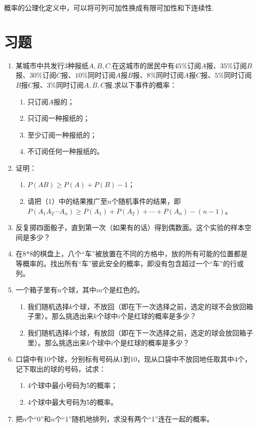 \begin{remark}
    概率的公理化定义中，可以将可列可加性换成有限可加性和下连续性.
\end{remark}

\section{习题}
    \begin{enumerate}
        \item 某城市中共发行3种报纸$A,B,C$.在这城市的居民中有$45\%$订阅$A$报、$35\%$订阅$B$报、$30\%$订阅$C$报、$10\%$同时订阅$A$报$B$报、$8\%$同时订阅$A$报$C$报、$5\%$同时订阅$B$报$C$报、$3\%$同时订阅$A,B,C$报.求以下事件的概率：
        \begin{enumerate}
            \item 只订阅$A$报的；
            \item 只订阅一种报纸的；
            \item 至少订阅一种报纸的；
            \item 不订阅任何一种报纸的。
        \end{enumerate}
\item 证明：
\begin{enumerate}
    \item $P(AB) \geq P(A)+P(B)-1$；
    \item 请把（1）中的结果推广至$n$个随机事件的结果，即
$P(A_1 A_2\cdots A_n) \geq P(A_1)+P(A_2)+\cdots+P(A_n)-(n-1)$。
\end{enumerate}


\item 反复掷四面骰子，直到第一次（如果有的话）得到偶数面。这个实验的样本空间是多少？

\item 在8*8的棋盘上，八个“车”被放置在不同的方格中，放的所有可能的位置都是等概率的。找出所有“车”彼此安全的概率，即没有包含超过一个“车”的行或列。

\item 一个箱子里有$n$个球，其中$m$个是红色的。
\begin{enumerate}
    \item 我们随机选择$k$个球，不放回（即在下一次选择之前，选定的球不会放回箱子里）。那么挑选出来$k$个球中$i$个是红球的概率是多少？
    \item 我们随机选择$k$个球，有放回（即在下一次选择之前，选定的球会放回箱子里）。那么挑选出来$k$个球中$i$个是红球的概率是多少？
\end{enumerate}

\item 口袋中有10个球，分别标有号码从1到10，现从口袋中不放回地任取其中4个，记下取出的球的号码，试求：
\begin{enumerate}
\item 4个球中最小号码为5的概率；
\item 4个球中最大号码为5的概率。
\end{enumerate}

\item  把$n$个“0”和$n$个“1”随机地排列，求没有两个“1”连在一起的概率。
    \end{enumerate}


